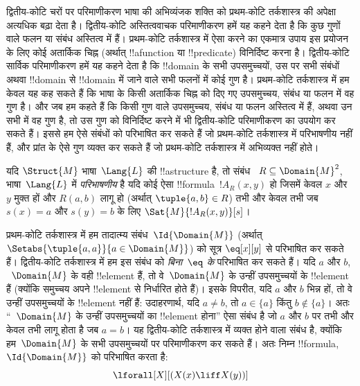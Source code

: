 \documentclass[../../../include/open-logic-section]{subfiles}
\begin{document}

\begin{explain}
द्वितीय-कोटि चरों पर परिमाणीकरण भाषा की अभिव्यंजक शक्ति को प्रथम-कोटि
तर्कशास्त्र की अपेक्षा अत्यधिक बढ़ा देता है। द्वितीय-कोटि अस्तित्ववाचक
परिमाणीकरण हमें यह कहने देता है कि कुछ गुणों वाले फलन या संबंध अस्तित्व में
हैं। प्रथम-कोटि तर्कशास्त्र में ऐसा करने का एकमात्र उपाय इस प्रयोजन के लिए
कोई अतार्किक चिह्न (अर्थात् !!a{function} या !!{predicate}) विनिर्दिष्ट करना
है। द्वितीय-कोटि सार्विक परिमाणीकरण हमें यह कहने देता है कि !!{domain} के
सभी उपसमुच्चयों, उस पर सभी संबंधों अथवा !!{domain} से !!{domain} में जाने वाले
सभी फलनों में कोई गुण है। प्रथम-कोटि तर्कशास्त्र में हम केवल यह कह सकते हैं
कि भाषा के किसी अतार्किक चिह्न को दिए गए उपसमुच्चय, संबंध या फलन में वह गुण
है। और जब हम कहते हैं कि किसी गुण वाले उपसमुच्चय, संबंध या फलन अस्तित्व में
हैं, अथवा उन सभी में वह गुण है, तो उस गुण को विनिर्दिष्ट करने में भी
द्वितीय-कोटि परिमाणीकरण का उपयोग कर सकते हैं। इससे हम ऐसे संबंधों को परिभाषित
कर सकते हैं जो प्रथम-कोटि तर्कशास्त्र में परिभाषणीय नहीं हैं, और प्रांत के
ऐसे गुण व्यक्त कर सकते हैं जो प्रथम-कोटि तर्कशास्त्र में अभिव्यक्त नहीं होते।
\end{explain}

\begin{defn}
यदि $\Struct{M}$ भाषा~$\Lang{L}$ की !!a{structure} है, तो संबंध
~$R \subseteq \Domain{M}^2$, भाषा~$\Lang{L}$ में \emph{परिभाषणीय} है यदि
कोई ऐसा !!{formula}~$!A_R(x, y)$ हो जिसमें केवल $x$ और~$y$ मुक्त हों और
$R(a, b)$ लागू हो (अर्थात् $\tuple{a,b} \in R$) तभी और केवल तभी जब
$s(x) = a$ और $s(y) = b$ के लिए $\Sat{M}{!A_R(x, y)}[s]$।
\end{defn}

\begin{ex}
प्रथम-कोटि तर्कशास्त्र में हम तादात्म्य संबंध~$\Id{\Domain{M}}$ (अर्थात्
$\Setabs{\tuple{a,a}}{a \in \Domain{M}}$) को सूत्र $\eq[x][y]$ से
परिभाषित कर सकते हैं। द्वितीय-कोटि तर्कशास्त्र में हम इस संबंध को
\emph{बिना~$\eq$ के} परिभाषित कर सकते हैं। यदि $a$ और $b$,
~$\Domain{M}$ के वही !!{element} हैं, तो वे~$\Domain{M}$ के उन्हीं
उपसमुच्चयों के !!{element} हैं (क्योंकि समुच्चय अपने !!{element} से निर्धारित
होते हैं)। इसके विपरीत, यदि $a$ और $b$ भिन्न हों, तो वे उन्हीं उपसमुच्चयों
के !!{element} नहीं हैं: उदाहरणार्थ, यदि $a \neq b$, तो $a \in \{a\}$ किंतु
$b \notin \{a\}$। अतः ``~$\Domain{M}$ के उन्हीं उपसमुच्चयों का !!{element}
होना'' ऐसा संबंध है जो $a$ और $b$ पर तभी और केवल तभी लागू होता है जब
$a = b$। यह द्वितीय-कोटि तर्कशास्त्र में व्यक्त होने वाला संबंध है, क्योंकि
हम~$\Domain{M}$ के सभी उपसमुच्चयों पर परिमाणीकरण कर सकते हैं। अतः निम्न
!!{formula}, $\Id{\Domain{M}}$ को परिभाषित करता है:
\[
\lforall[X][(X(x) \liff X(y))]
\]
\end{ex}
\end{document}
